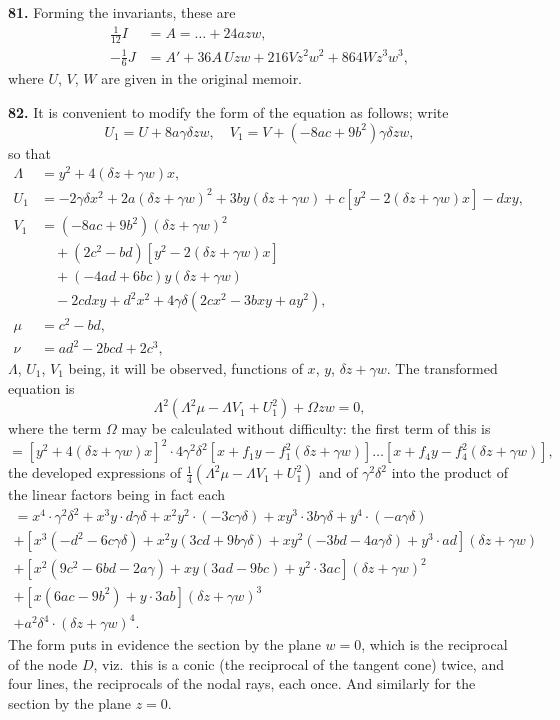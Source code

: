 \documentclass[11pt,a4paper]{article}
\theoremstyle{definition}
\begin{document}
\textbf{81.} Forming the invariants, these are
\begin{align*}
\tfrac{1}{12}I &= A = \ldots + 24azw, \\
-\tfrac{1}{6}J &= A' + 36A\,Uzw + 216Vz^2w^2 + 864Wz^3w^3,
\end{align*}
where $U$, $V$, $W$ are given in the original memoir.

\textbf{82.} It is convenient to modify the form of the equation as follows; write
\[
U_1 = U + 8a\gamma\delta zw, \quad V_1 = V + (-8ac + 9b^2)\gamma\delta zw,
\]
so that
\begin{align*}
\Lambda &= y^2 + 4(\delta z + \gamma w)x, \\
U_1 &= -2\gamma\delta x^2 + 2a(\delta z + \gamma w)^2 + 3by(\delta z + \gamma w) + c[y^2 - 2(\delta z + \gamma w)x] - dxy, \\
V_1 &= (-8ac + 9b^2)(\delta z + \gamma w)^2 \\
  &\quad + (2c^2 - bd)[y^2 - 2(\delta z + \gamma w)x] \\
  &\quad + (-4ad + 6bc)y(\delta z + \gamma w) \\
  &\quad - 2cdxy + d^2x^2 + 4\gamma\delta(2cx^2 - 3bxy + ay^2), \\
\mu &= c^2 - bd, \\
\nu &= ad^2 - 2bcd + 2c^3,
\end{align*}
$\Lambda$, $U_1$, $V_1$ being, it will be observed, functions of $x$, $y$, $\delta z + \gamma w$. The transformed equation is
\[
\Lambda^2(\Lambda^2\mu - \Lambda V_1 + U_1^2) + \Omega zw = 0,
\]
where the term $\Omega$ may be calculated without difficulty: the first term of this is
\[
= [y^2 + 4(\delta z + \gamma w)x]^2 \cdot 4\gamma^2\delta^2 [x + f_1y - f_1^2(\delta z + \gamma w)] \ldots [x + f_4y - f_4^2(\delta z + \gamma w)],
\]
the developed expressions of $\tfrac{1}{4}(\Lambda^2\mu - \Lambda V_1 + U_1^2)$ and of $\gamma^2\delta^2$ into the product of the linear factors being in fact each
\begin{multline*}
= x^4 \cdot \gamma^2\delta^2 + x^3y \cdot d\gamma\delta + x^2y^2 \cdot (-3c\gamma\delta) + xy^3 \cdot 3b\gamma\delta + y^4 \cdot (-a\gamma\delta) \\
+ [x^3(-d^2 - 6c\gamma\delta) + x^2y(3cd + 9b\gamma\delta) + xy^2(-3bd - 4a\gamma\delta) + y^3 \cdot ad](\delta z + \gamma w) \\
+ [x^2(9c^2 - 6bd - 2a\gamma) + xy(3ad - 9bc) + y^2 \cdot 3ac](\delta z + \gamma w)^2 \\
+ [x(6ac - 9b^2) + y \cdot 3ab](\delta z + \gamma w)^3 \\
+ a^2\delta^4 \cdot (\delta z + \gamma w)^4.
\end{multline*}
The form puts in evidence the section by the plane $w = 0$, which is the reciprocal of the node $D$, viz.\ this is a conic (the reciprocal of the tangent cone) twice, and four lines, the reciprocals of the nodal rays, each once. And similarly for the section by the plane $z = 0$.
\end{document}
